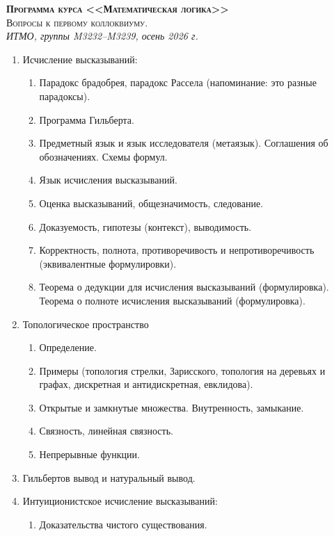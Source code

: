 \documentclass[11pt,a4paper,oneside]{scrartcl}
\begin{document}
\pagestyle{empty}

\begin{center}
{\large\scshape\bfseries Программа курса <<Математическая логика>>}\\
{\large\scshape Вопросы к первому коллоквиуму.}\\
\itshape ИТМО, группы M3232--M3239, осень 2026 г.
\end{center}


\begin{enumerate}
\item Исчисление высказываний:
\begin{enumerate}
\item Парадокс брадобрея, парадокс Рассела (напоминание: это разные парадоксы).
\item Программа Гильберта.
\item Предметный язык и язык исследователя (метаязык). Соглашения об обозначениях. Схемы формул.
\item Язык исчисления высказываний.
\item Оценка высказываний, общезначимость, следование.
\item Доказуемость, гипотезы (контекст), выводимость.
\item Корректность, полнота, противоречивость и непротиворечивость (эквивалентные формулировки).
\item Теорема о дедукции для исчисления высказываний (формулировка). Теорема о полноте исчисления высказываний (формулировка).
\end{enumerate}
\item Топологическое пространство
\begin{enumerate}
\item Определение.
\item Примеры (топология стрелки, Зарисского, топология на деревьях и графах, 
дискретная и антидискретная, евклидова).
\item Открытые и замкнутые множества. Внутренность, замыкание. 
\item Связность, линейная связность.
\item Непрерывные функции.
\end{enumerate}
\item Гильбертов вывод и натуральный вывод.
\item Интуиционистское исчисление высказываний:
\begin{enumerate}
\item Доказательства чистого существования.

\end{enumerate}
\end{enumerate}
\end{document}
